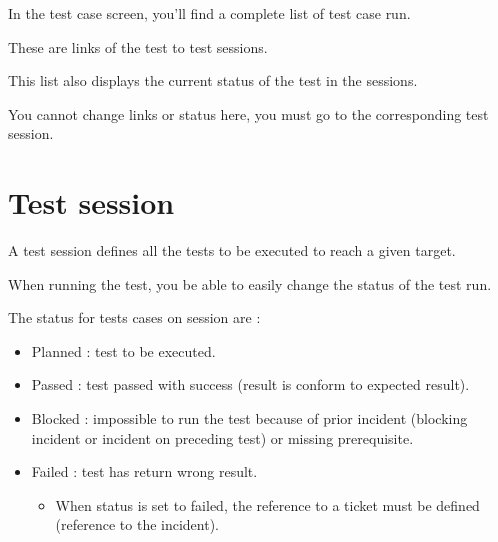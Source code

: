 \documentclass[letterpaper,10pt,english]{sphinxmanual}
\begin{document}
In the test case screen, you’ll find a complete list of test case run.

These are links of the test to test sessions.

This list also displays the current status of the test in the sessions.

You cannot change links or status here, you must go to the corresponding test session.
\newpage
{}

\section{Test session}
\label{RequirementsTest:test-session}\label{RequirementsTest:reqtest-test-session-label}\label{RequirementsTest:index-2}
A test session defines all the tests to be executed to reach a given target.

When running the test, you be able to easily change the status of the test run.

The status for tests cases on session are :
\begin{itemize}
\item {} 
Planned : test to be executed.

\item {} 
Passed : test passed with success (result is conform to expected result).

\item {} 
Blocked : impossible to run the test because of prior incident (blocking incident or incident on preceding test) or missing prerequisite.

\item {} 
Failed : test has return wrong result.
\begin{itemize}
\item {} 
When status is set to failed, the reference to a ticket must be defined (reference to the incident).

\end{itemize}

\end{itemize}
\end{document}
